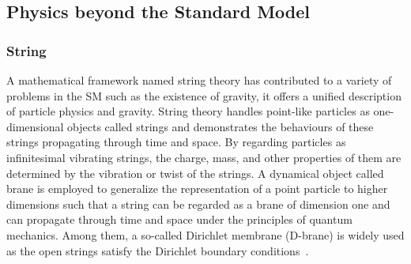 \documentclass[UTF8,12pt]{ctexart}
\numberwithin{equation}{section}
\def\mjj{$m_{jj}$ }
\begin{document}
\subsection{Physics beyond the Standard Model}
\label{sec:2.2}

%
%

\subsubsection{String}


A mathematical framework named string theory has contributed to a variety of problems in the SM such as the existence of gravity, it offers a unified description of particle physics and gravity. String theory handles point-like particles as one-dimensional objects called strings and demonstrates the behaviours of these strings propagating through time and space. By regarding particles as infinitesimal vibrating strings, the charge, mass, and other properties of them are determined by the vibration or twist of the strings. A dynamical object called brane is employed to generalize the representation of a point particle to higher dimensions such that a string can be regarded as a brane of dimension one and can propagate through time and space under the principles of quantum mechanics. Among them, a so-called Dirichlet membrane (D-brane) is widely used as the open strings satisfy the Dirichlet boundary conditions~\cite{Antoniadis:2000ena,Cremades:2002qm,Antoniadis:2002qm}.
\end{document}
